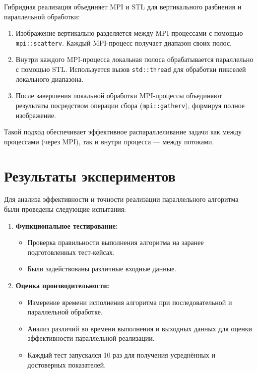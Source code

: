 \documentclass[12pt]{article}
\begin{document}
Гибридная реализация объединяет MPI и STL для вертикального разбиения и параллельной обработки:

\begin{enumerate}
	\item Изображение вертикально разделяется между MPI-процессами с помощью \texttt{mpi::scatterv}. Каждый MPI-процесс получает диапазон своих полос.

	\item Внутри каждого MPI-процесса локальная полоса обрабатывается параллельно с помощью STL. Используется вызов \texttt{std::thread} для обработки пикселей локального диапазона.

	\item После завершения локальной обработки MPI-процессы объединяют результаты посредством операции сбора (\texttt{mpi::gatherv}), формируя полное изображение.
\end{enumerate}

Такой подход обеспечивает эффективное распараллеливание задачи как между процессами (через MPI), так и внутри процесса --- между потоками.

\section{Результаты экспериментов}

Для анализа эффективности и точности реализации параллельного алгоритма были проведены следующие испытания:

\begin{enumerate}
	\item \textbf{Функциональное тестирование:}
	\begin{itemize}
		\item Проверка правильности выполнения алгоритма на заранее подготовленных тест-кейсах.
		\item Были задействованы различные входные данные.
	\end{itemize}
	
	\item \textbf{Оценка производительности:}
	\begin{itemize}
		\item Измерение времени исполнения алгоритма при последовательной и параллельной обработке.
		\item Анализ различий во времени выполнения и выходных данных для оценки эффективности параллельной реализации.
		\item Каждый тест запускался 10 раз для получения усреднённых и достоверных показателей.
	\end{itemize}
\end{enumerate}
\end{document}
